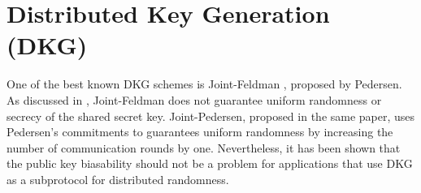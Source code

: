 \documentclass[letterpaper,twocolumn,10pt]{article}
\theoremstyle{definition}
\theoremstyle{remark}
\begin{document}
\section{Distributed Key Generation (DKG)}
\label{appendix:dkg}
\iffalse
    A DKG protocol should satisfy the following security requirements:
    \begin{itemize}
        \item Correctness
            \begin{enumerate}
            \item All subsets of $t + 1$ shares provided by honest participants define the same unique secret key $x$.
            \item All honest participants have the same value of public key $y=g^x$, where $x$ is the unique secret guaranteed above.
            \item $x$ is uniformly distributed in $\mathbb{Z}_q$, and thus $y$ is uniformly distributed in $\mathbb{G}_q$ (subgroup of $\mathbb{Z}^*_p$ generated by $g$).
            \end{enumerate}
            
        \item Secrecy. No information on $x$ can be learned by the adversary except for what is implied by the value $y = g^x$.
    \end{itemize}
\fi
One of the best known DKG schemes is Joint-Feldman \cite{pedersen1991threshold}, proposed by Pedersen. As discussed in \cite{gennaro1999secure}, Joint-Feldman does not guarantee uniform randomness or secrecy of the shared secret key. Joint-Pedersen, proposed in the same paper, uses Pedersen's commitments to guarantees uniform randomness by increasing the number of communication rounds by one. Nevertheless, it has been shown that the public key biasability should not be a problem for applications that use DKG as a subprotocol for distributed randomness.
\end{document}
